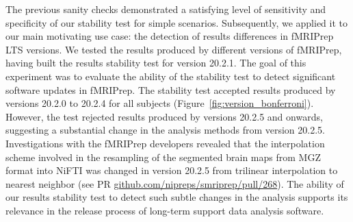\documentclass[lettersize,journal]{IEEEtran}
\newcommand{\fmriprep}{fMRIPrep\xspace}
\begin{document}
The previous sanity checks demonstrated a satisfying level of sensitivity and specificity of our stability test for simple scenarios. Subsequently, we applied it to our main motivating use case: the detection of results differences in \fmriprep LTS versions. We tested the results produced by different versions of \fmriprep, having built the results stability test for version 20.2.1. The goal of this experiment was to evaluate the ability of the stability test to detect significant software updates in \fmriprep. The stability test accepted results produced by versions 20.2.0 to 20.2.4 for all subjects (Figure~\ref{fig:version_bonferroni}). However, the test rejected results produced by versions 20.2.5 and onwards, suggesting a substantial change in the analysis methods from version 20.2.5. Investigations with the \fmriprep developers revealed that the interpolation scheme involved in the resampling of the segmented brain maps from MGZ format into NiFTI was changed in version {20.2.5} from trilinear interpolation to nearest neighbor (see PR \href{https://github.com/nipreps/smriprep/pull/268}{\url{github.com/nipreps/smriprep/pull/268}}). The ability of our results stability test to detect such subtle changes in the analysis supports its relevance in the release process of long-term support data analysis software.
\end{document}
